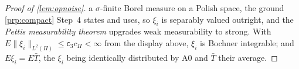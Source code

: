 \begin{proof}[Proof of \cref{lem:opnoise}]
a $\sigma$-finite Borel measure on a Polish space, the ground \cref{prp:compact} Step~4 states and
uses, so $\xi_i$ is separably valued outright, and the \emph{Pettis measurability theorem} upgrades
weak measurability to strong. With $E\|\xi_i\|_{L^{2}(\Pi)}\le\mathsf c_3c_\Pi<\infty$ from the display
above, $\xi_i$ is Bochner integrable; and $E\xi_i=E\bar T$, the $\xi_i$ being identically distributed by
A0 and $\bar T$ their average.

\end{proof}
